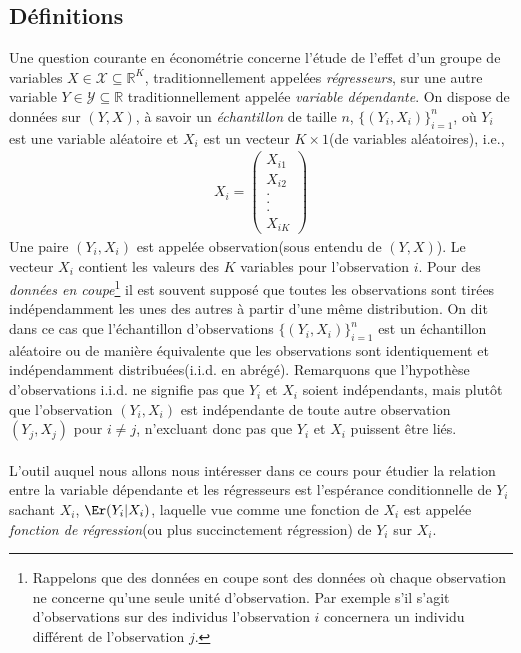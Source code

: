 \subsection{Définitions}
Une question courante en économétrie concerne l'étude de l'effet d'un groupe de variables $X \in \mathcal{X}\subseteq \mathbb{R}^K$, traditionnellement appelées \emph{régresseurs}, sur une autre variable $Y\in \mathcal{Y}\subseteq\mathbb{R}$ traditionnellement  appelée \emph{variable dépendante}.  On dispose de données  sur $(Y, X)$, à savoir un \emph{échantillon} de taille $n$,  $\{(Y_i, X_i)\}_{i=1}^n$, où $Y_i$ est une variable aléatoire et $X_i$ est un vecteur $K\times 1$(de variables aléatoires), i.e.,
\begin{align*}
X_i = 
\left(
\begin{array}{c}
X_{i1}\\
X_{i2}\\
.\\
.\\
.\\
X_{iK}
\end{array}
\right)
\end{align*}
Une paire $(Y_i, X_i)$ est appelée observation(sous entendu de $(Y, X)$). Le vecteur $X_i$ contient les valeurs des $K$ variables pour l'observation $i$.
Pour des \emph{données en coupe}\footnote{Rappelons que des données en coupe sont des données où chaque observation ne concerne qu'une seule unité d'observation. Par exemple s'il s'agit d'observations sur des individus l'observation $i$ concernera un individu différent de l'observation $j$.} il est souvent supposé que toutes les observations sont tirées indépendamment les unes des autres à partir d'une même distribution. On dit dans ce cas que l'échantillon d'observations $\{(Y_i, X_i)\}_{i=1}^n$ est un échantillon aléatoire ou de manière équivalente que les observations sont identiquement et indépendamment distribuées(i.i.d. en abrégé). Remarquons que l'hypothèse d'observations i.i.d. ne signifie pas que $Y_i$ et $X_i$ soient indépendants, mais plutôt que l'observation $(Y_i, X_i)$ est indépendante de toute autre observation $(Y_j, X_j)$ pour $i\neq j$, n'excluant donc pas que $Y_i$ et $X_i$ puissent être liés.\\\\
L'outil auquel nous allons nous intéresser dans ce cours pour étudier la relation entre la variable dépendante et les régresseurs est l'espérance conditionnelle de $Y_i$ sachant $X_i$, $\Er(Y_i| X_i)$, laquelle vue comme une fonction de $X_i$ est appelée \emph{fonction de régression}(ou plus succinctement régression) de $Y_i$ sur $X_i$.\\

